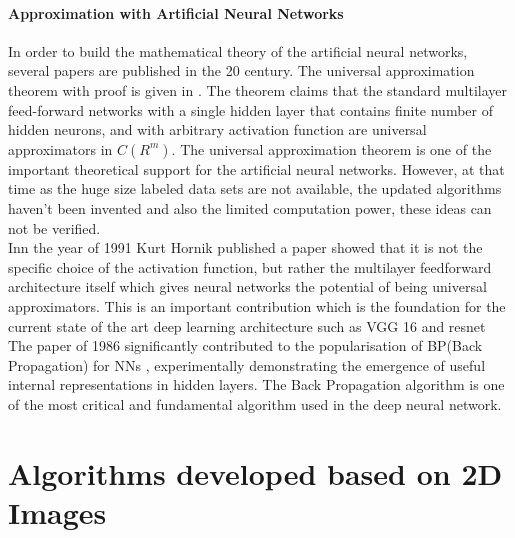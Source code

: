 \documentclass[a4paper,12pt]{article}
\begin{document}
\subsection{Approximation with Artificial Neural Networks }
In order to build the mathematical theory of the artificial neural networks, several papers are published in the 20 century. The universal approximation theorem with proof is given in \cite{csaji2001}. The theorem claims \cite{csaji2001}  that the standard multilayer feed-forward networks with a single hidden layer that contains finite number of hidden neurons, and with arbitrary activation function are universal approximators in $C(R^m)$.  The universal approximation theorem is one of the important theoretical support for the artificial neural networks. However, at that time as the huge size labeled data sets are not available, the updated algorithms haven't been invented and also the limited computation power, these ideas can not be verified.\\
Inn the year of 1991 Kurt Hornik published a paper \cite{hornik1991} showed that it is not the specific choice of the activation function, but rather the multilayer feedforward architecture itself which gives neural networks the potential of being universal approximators. This is an important contribution which is the foundation for the current state of the art deep learning architecture such as VGG 16  \cite{SimonyanZ14a} and resnet \cite{DBLP:journals/corr/HeZRS15}
The paper of 1986 significantly contributed to the popularisation of BP(Back Propagation) for NNs \cite{Rumelhart1986}, experimentally demonstrating the emergence of useful internal representations in hidden layers. The Back Propagation algorithm is one of the most critical and fundamental algorithm used in the deep neural network. 

\part{Algorithms developed based on 2D Images}
\end{document}
